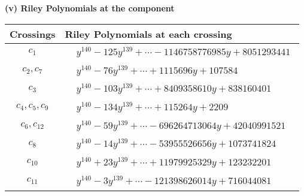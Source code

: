 \documentclass[1p]{elsarticle_modified}
\theoremstyle{definition}
\begin{document}
\newpage\renewcommand{\arraystretch}{1}
\flushleft \textbf{(v) Riley Polynomials at the component}\newline \\
\begin{tabular}{m{50pt}|m{274pt}}
Crossings & \hspace{64pt}Riley Polynomials at each crossing \\
\hline $$\begin{aligned}c_{1}\end{aligned}$$&$\begin{aligned}
&y^{140}-125 y^{139}+\cdots-1146758776985 y+8051293441
\end{aligned}$\\
\hline $$\begin{aligned}c_{2},c_{7}\end{aligned}$$&$\begin{aligned}
&y^{140}-76 y^{139}+\cdots+1115696 y+107584
\end{aligned}$\\
\hline $$\begin{aligned}c_{3}\end{aligned}$$&$\begin{aligned}
&y^{140}-103 y^{139}+\cdots+8409358610 y+838160401
\end{aligned}$\\
\hline $$\begin{aligned}c_{4},c_{5},c_{9}\end{aligned}$$&$\begin{aligned}
&y^{140}-134 y^{139}+\cdots+115264 y+2209
\end{aligned}$\\
\hline $$\begin{aligned}c_{6},c_{12}\end{aligned}$$&$\begin{aligned}
&y^{140}-59 y^{139}+\cdots-696264713064 y+42040991521
\end{aligned}$\\
\hline $$\begin{aligned}c_{8}\end{aligned}$$&$\begin{aligned}
&y^{140}-14 y^{139}+\cdots-53955526656 y+1073741824
\end{aligned}$\\
\hline $$\begin{aligned}c_{10}\end{aligned}$$&$\begin{aligned}
&y^{140}+23 y^{139}+\cdots+11979925329 y+123232201
\end{aligned}$\\
\hline $$\begin{aligned}c_{11}\end{aligned}$$&$\begin{aligned}
&y^{140}-3 y^{139}+\cdots-121398626014 y+716044081
\end{aligned}$\\
\hline
\end{tabular}\\~\\
\end{document}
